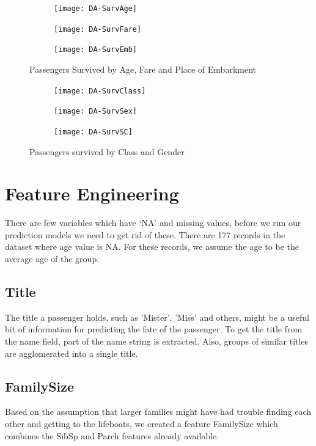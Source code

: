 \documentclass[a4paper,10pt]{report}\usepackage[]{graphicx}\usepackage[]{color}
\begin{document}
\begin{figure}[h]
\centering
  \begin{subfigure}[b]{0.3\textwidth}
    \texttt{[image: DA-SurvAge]}
    \end{subfigure}
  \begin{subfigure}[b]{0.3\textwidth}
    \texttt{[image: DA-SurvFare]}
    \end{subfigure}
    \begin{subfigure}[b]{0.3\textwidth}
    \texttt{[image: DA-SurvEmb]}
  \end{subfigure}
  \caption{Passengers Survived by Age, Fare and Place of Embarkment}\label{Surv}
\end{figure}






\begin{figure}[h]
\centering
  \begin{subfigure}[b]{0.3\textwidth}
    \texttt{[image: DA-SurvClass]}
    \end{subfigure}
  \begin{subfigure}[b]{0.3\textwidth}
    \texttt{[image: DA-SurvSex]}
    \end{subfigure}
  \begin{subfigure}[b]{0.3\textwidth}
    \texttt{[image: DA-SurvSC]}
  \end{subfigure}
  \caption{Passengers survived by Class and Gender}\label{SurvCSE}
\end{figure}

\section{Feature Engineering}
There are few variables which have `NA' and missing values, before we run our prediction models we need to get rid of these. There are 177 records in the dataset where age value is NA. For these records, we assume the age to be the average age of the group.
\subsection{Title}
The title a passenger holds, such as 'Mister', 'Miss' and others, might be a useful bit of information for predicting the fate of the passenger. To get the title from the name field, part of the name string is extracted. Also, groups of similar titles are agglomerated into a single title. 


\subsection{FamilySize}
Based on the assumption that larger families might have had trouble finding each other and getting to the lifeboats, we created a feature FamilySize which combines the SibSp and Parch features already available.
\end{document}
